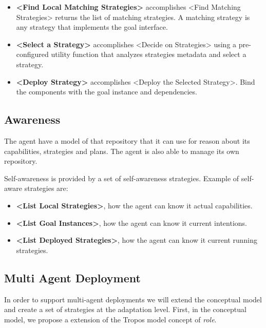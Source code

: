 \begin{itemize}
  \item \textbf{<Find Local Matching Strategies>} accomplishes <Find Matching Strategies>
  returns the list of matching strategies. A matching strategy is any strategy that implements the goal interface.

  \item \textbf{<Select a Strategy>} accomplishes <Decide on Strategies>
  using a pre-configured utility function that analyzes strategies metadata and select a strategy.

  \item \textbf{<Deploy Strategy>} accomplishes <Deploy the Selected Strategy>. Bind the components with the goal instance and dependencies.
\end{itemize}

\subsection{Awareness}

The agent have a model of that repository that it can use for reason about its capabilities, strategies and plans. The agent is also able to manage its own repository.

Self-awareness is provided by a set of self-awareness strategies. Example of self-aware strategies are:

\begin{itemize}
  \item \textbf{<List Local Strategies>}, how the agent can know it actual capabilities.

  \item \textbf{<List Goal Instances>}, how the agent can know it current intentions.

  \item \textbf{<List Deployed Strategies>}, how the agent can know it current running strategies.

\end{itemize}


\subsection{Multi Agent Deployment}

In order to support multi-agent deployments we will extend the conceptual model and create a set of strategies at the adaptation level. First, in the conceptual model, we propose a extension of the Tropos model concept of \emph{role}.

